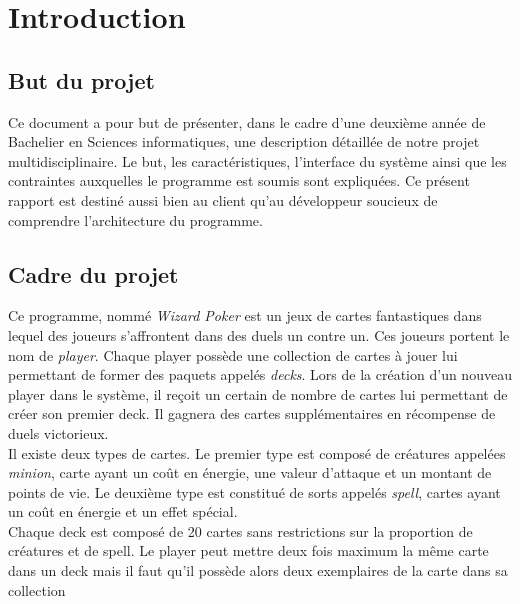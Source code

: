 \chapter{Introduction}
\section{But du projet}

\noindent Ce document a pour but de présenter, dans le cadre d'une deuxième année de Bachelier en Sciences informatiques, une description détaillée de notre projet multidisciplinaire. Le but, les caractéristiques, l'interface du système ainsi que les contraintes auxquelles le programme est soumis sont expliquées. Ce présent rapport est destiné aussi bien au client qu'au développeur soucieux de comprendre l'architecture du programme.
\section{Cadre du projet}
\noindent Ce programme, nommé \emph{Wizard Poker} est un jeux de cartes fantastiques dans lequel des joueurs s'affrontent dans des duels un contre un. Ces joueurs portent le nom de \emph{player}. Chaque player possède une collection de cartes à jouer lui permettant de former des paquets appelés \emph{decks}. Lors de la création d'un nouveau player dans le système, il reçoit un certain de nombre de cartes lui permettant de créer son premier deck. Il gagnera des cartes supplémentaires en récompense de duels victorieux.\\
Il existe deux types de cartes. Le premier type est composé de créatures appelées \emph{minion}, carte ayant un coût en énergie, une valeur d'attaque et un montant de points de vie. Le deuxième type est constitué de sorts appelés \emph{spell}, cartes ayant un coût en énergie et un effet spécial.\\
Chaque deck est composé de 20 cartes sans restrictions sur la proportion de créatures et de spell. Le player peut mettre deux fois maximum la même carte dans un deck mais il faut qu'il possède alors deux exemplaires de la carte dans sa collection\\
